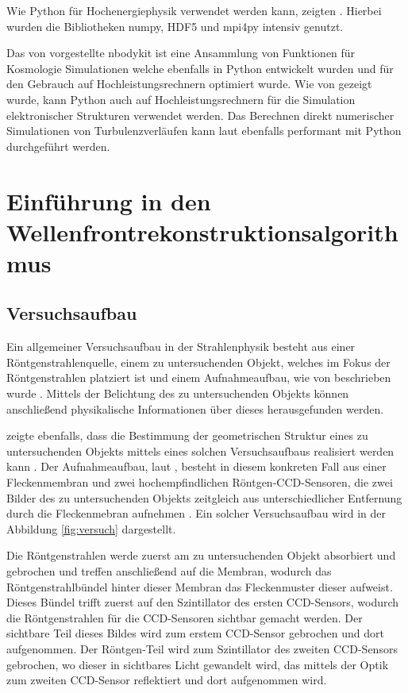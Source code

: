 Wie Python für Hochenergiephysik verwendet werden kann, zeigten \citeauthor{SKP+17}. \cite{SKP+17} Hierbei wurden die Bibliotheken numpy, HDF5 und mpi4py intensiv genutzt.

Das von \citeauthor{HF17} vorgestellte nbodykit ist eine Ansammlung von Funktionen für Kosmologie Simulationen welche ebenfalls in Python entwickelt wurden und für den Gebrauch auf Hochleistungsrechnern optimiert wurde. \cite{HF17} Wie \citeyear{ERS+11} von \citeauthor{ERS+11} gezeigt wurde, kann Python auch auf Hochleistungsrechnern für die Simulation elektronischer Strukturen verwendet werden. \cite{ERS+11} Das Berechnen direkt numerischer Simulationen von Turbulenzverläufen kann laut \citeauthor{ML16} ebenfalls performant mit Python durchgeführt werden. \cite{ML16}

\section{Einführung in den Wellenfrontrekonstruktionsalgorithmus}

\subsection{Versuchsaufbau}

Ein allgemeiner Versuchsaufbau in der Strahlenphysik besteht aus einer Röntgenstrahlenquelle, einem zu untersuchenden Objekt, welches im Fokus der Röntgenstrahlen platziert ist und einem Aufnahmeaufbau, wie von \citeauthor{Ber13} beschrieben wurde . Mittels der Belichtung des zu untersuchenden Objekts können anschließend physikalische Informationen über dieses herausgefunden werden.

\citeauthor{Ber13} zeigte ebenfalls, dass die Bestimmung der geometrischen Struktur eines zu untersuchenden Objekts mittels eines solchen Versuchsaufbaus realisiert werden kann . Der Aufnahmeaufbau, laut \citeauthor{Ber15}, besteht in diesem konkreten Fall aus einer Fleckenmembran und zwei hochempfindlichen Röntgen-\gls{CCD}-Sensoren, die zwei Bilder des zu untersuchenden Objekts zeitgleich aus unterschiedlicher Entfernung durch die Fleckenmebran aufnehmen . Ein solcher Versuchsaufbau wird in der Abbildung \ref{fig:versuch} dargestellt.

Die Röntgenstrahlen werde zuerst am zu untersuchenden Objekt absorbiert und gebrochen und treffen anschließend auf die Membran, wodurch das Röntgenstrahlbündel hinter dieser Membran das Fleckenmuster dieser aufweist. Dieses Bündel trifft zuerst auf den Szintillator des ersten \gls{CCD}-Sensors, wodurch die Röntgenstrahlen für die \gls{CCD}-Sensoren sichtbar gemacht werden. Der sichtbare Teil dieses Bildes wird zum erstem \gls{CCD}-Sensor gebrochen und dort aufgenommen. Der Röntgen-Teil wird zum Szintillator des zweiten \gls{CCD}-Sensors gebrochen, wo dieser in sichtbares Licht gewandelt wird, das mittels der Optik zum zweiten \gls{CCD}-Sensor reflektiert und dort aufgenommen wird. 

